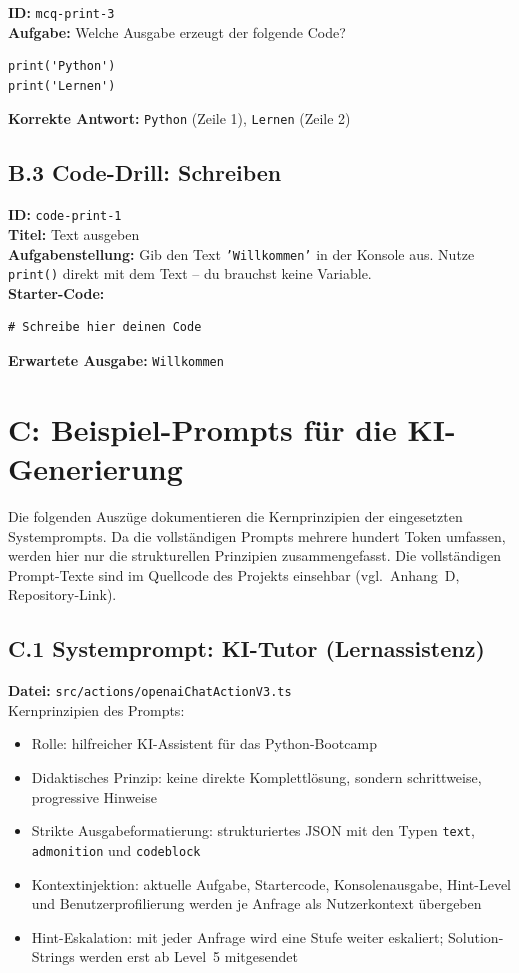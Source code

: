 \textbf{ID:} \texttt{mcq-print-3} \\
\textbf{Aufgabe:} Welche Ausgabe erzeugt der folgende Code?
\begin{verbatim}
print('Python')
print('Lernen')
\end{verbatim}
\textbf{Korrekte Antwort:} \texttt{Python} (Zeile 1), \texttt{Lernen} (Zeile 2)

\subsection*{B.3 Code-Drill: Schreiben}

\textbf{ID:} \texttt{code-print-1} \\
\textbf{Titel:} Text ausgeben \\
\textbf{Aufgabenstellung:} Gib den Text \texttt{'Willkommen'} in der Konsole aus. Nutze \texttt{print()} direkt mit dem Text -- du brauchst keine Variable. \\
\textbf{Starter-Code:}
\begin{verbatim}
# Schreibe hier deinen Code
\end{verbatim}
\textbf{Erwartete Ausgabe:} \texttt{Willkommen}

\section*{C: Beispiel-Prompts für die KI-Generierung}

Die folgenden Auszüge dokumentieren die Kernprinzipien der eingesetzten Systemprompts. Da die vollständigen Prompts mehrere hundert Token umfassen, werden hier nur die strukturellen Prinzipien zusammengefasst. Die vollständigen Prompt-Texte sind im Quellcode des Projekts einsehbar (vgl.\ Anhang~D, Repository-Link).

\subsection*{C.1 Systemprompt: KI-Tutor (Lernassistenz)}

\textbf{Datei:} \texttt{src/actions/openaiChatActionV3.ts} \\

\noindent Kernprinzipien des Prompts:
\begin{itemize}
    \item Rolle: hilfreicher KI-Assistent für das Python-Bootcamp
    \item Didaktisches Prinzip: keine direkte Komplettlösung, sondern schrittweise, progressive Hinweise
    \item Strikte Ausgabeformatierung: strukturiertes JSON mit den Typen \texttt{text}, \texttt{admonition} und \texttt{codeblock}
    \item Kontextinjek\-tion: aktuelle Aufgabe, Startercode, Konsolenausgabe, Hint-Level und Benutzerprofilierung werden je Anfrage als Nutzerkontext übergeben
    \item Hint-Eskalation: mit jeder Anfrage wird eine Stufe weiter eskaliert; Solution-Strings werden erst ab Level~5 mitgesendet
\end{itemize}

